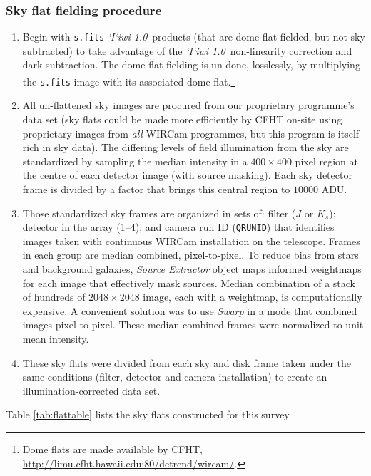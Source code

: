 \documentclass[iop]{emulateapj}
\newcommand{\sw}[1]{\textit{#1}} %
\newcommand{\iiwione}{\sw{`I`iwi 1.0}}
\begin{document}
\subsubsection{Sky flat fielding procedure}
\label{sec:skyflatpro}

\begin{enumerate}
	\item Begin with  \texttt{s.fits} \iiwione\ products (that are dome flat fielded, but not sky subtracted) to take advantage of the \iiwione\ non-linearity correction and dark subtraction. The dome flat fielding is un-done, losslessly, by multiplying the \texttt{s.fits} image with its associated dome flat.\footnote{Dome flats are made available by CFHT, \url{http://limu.cfht.hawaii.edu:80/detrend/wircam/}.}
	\item All un-flattened sky images are procured from our proprietary programme's data set (sky flats could be made more efficiently by CFHT on-site using proprietary images from \emph{all} WIRCam programmes, but this program is itself rich in sky data). The differing levels of field illumination from the sky are standardized by sampling the median intensity in a $400\times 400$ pixel region at the centre of each detector image (with source masking). Each sky detector frame is divided by a factor that brings this central region to $10000$ ADU.
	\item Those standardized sky frames are organized in sets of: filter ($J$ or $K_s$); detector in the array (1--4); and camera run ID (\texttt{QRUNID}) that identifies images taken with continuous WIRCam installation on the telescope. Frames in each group are median combined, pixel-to-pixel. To reduce bias from stars and background galaxies, \sw{Source Extractor} object maps informed weightmaps for each image that effectively mask sources. Median combination of a stack of hundreds of $2048\times2048$ image, each with a weightmap, is computationally expensive. A convenient solution was to use \sw{Swarp} \citep[an image-mosaicing software package,][]{Bertin:2002} in a mode that combined images pixel-to-pixel. These median combined frames were normalized to unit mean intensity.
	\item These sky flats were divided from each sky and disk frame taken under the same conditions (filter, detector and camera installation) to create an illumination-corrected data set.
\end{enumerate}

\noindent Table \ref{tab:flattable} lists the sky flats constructed for this survey.
\end{document}

